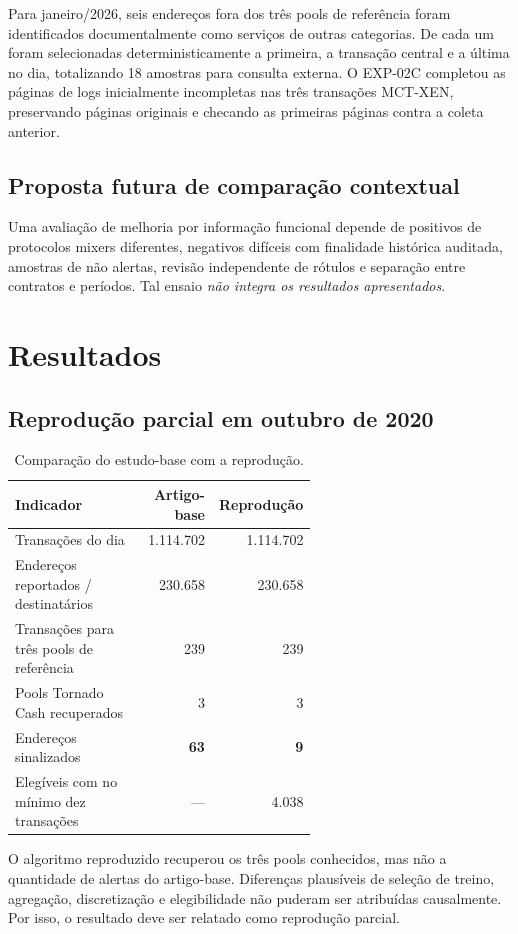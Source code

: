 \documentclass[11pt,a4paper]{article}
\begin{document}
Para janeiro/2026, seis endereços fora dos três pools de referência foram identificados documentalmente como serviços de outras categorias. De cada um foram selecionadas deterministicamente a primeira, a transação central e a última no dia, totalizando 18 amostras para consulta externa. O EXP-02C completou as páginas de logs inicialmente incompletas nas três transações MCT-XEN, preservando páginas originais e checando as primeiras páginas contra a coleta anterior.

\subsection{Proposta futura de comparação contextual}
Uma avaliação de melhoria por informação funcional depende de positivos de protocolos mixers diferentes, negativos difíceis com finalidade histórica auditada, amostras de não alertas, revisão independente de rótulos e separação entre contratos e períodos. Tal ensaio \emph{não integra os resultados apresentados}.

\section{Resultados}
\subsection{Reprodução parcial em outubro de 2020}
\begin{table}[htbp]
\centering
\small
\caption{Comparação do estudo-base com a reprodução.}
\label{tab:reproducao}
\begin{tabular}{p{0.60\linewidth}rr}
\toprule
Indicador & Artigo-base & Reprodução\\
\midrule
Transações do dia & 1.114.702 & 1.114.702\\
Endereços reportados / destinatários & 230.658 & 230.658\\
Transações para três pools de referência & 239 & 239\\
Pools Tornado Cash recuperados & 3 & 3\\
Endereços sinalizados & \textbf{63} & \textbf{9}\\
Elegíveis com no mínimo dez transações & --- & 4.038\\
\bottomrule
\end{tabular}
\end{table}

O algoritmo reproduzido recuperou os três pools conhecidos, mas não a quantidade de alertas do artigo-base. Diferenças plausíveis de seleção de treino, agregação, discretização e elegibilidade não puderam ser atribuídas causalmente. Por isso, o resultado deve ser relatado como reprodução parcial.
\end{document}

